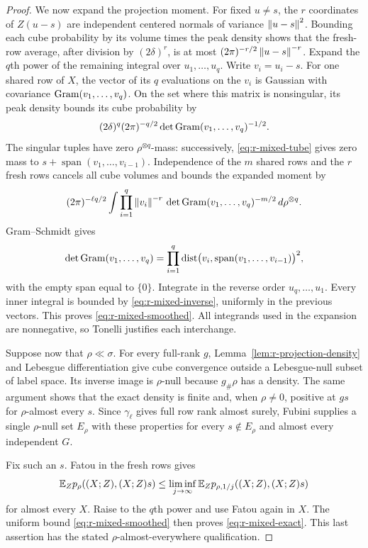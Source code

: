 \begin{proof}
We now expand the projection moment.  For fixed \(u\ne s\), the
\(r\) coordinates of \(Z(u-s)\) are independent centered normals
of variance \(\left\lVert u-s\right\rVert^2\).  Bounding each cube probability by
its volume times the peak density shows that the fresh-row average,
after division by \((2\delta)^r\), is at most
\((2\pi)^{-r/2}\left\lVert u-s\right\rVert^{-r}\).
Expand the \(q\)th power of the remaining integral over
\(u_1,\ldots,u_q\).  Write \(v_i=u_i-s\).  For one shared row of
\(X\), the vector of its \(q\) evaluations on the \(v_i\) is
Gaussian with covariance \(\operatorname{Gram}(v_1,\ldots,v_q)\).  On the set
where this matrix is nonsingular, its peak density bounds its cube
probability by
\[
 (2\delta)^q(2\pi)^{-q/2}
       \det\operatorname{Gram}(v_1,\ldots,v_q)^{-1/2}.
\]
The singular tuples have zero \(\rho^{\otimes q}\)-mass:
successively, \eqref{eq:r-mixed-tube} gives zero mass to
\(s+\operatorname{span}(v_1,\ldots,v_{i-1})\).  Independence of
the \(m\) shared rows and the \(r\) fresh rows cancels all cube
volumes and bounds the expanded moment by
\begin{equation}\label{eq:r-mixed-collision}
 (2\pi)^{-\ell q/2}
 \int\prod_{i=1}^q\left\lVert v_i\right\rVert^{-r}\,
       \det\operatorname{Gram}(v_1,\ldots,v_q)^{-m/2}\,d\rho^{\otimes q}.
\end{equation}
Gram--Schmidt gives
\[
 \det\operatorname{Gram}(v_1,\ldots,v_q)
   =\prod_{i=1}^q
       \operatorname{dist}\bigl(v_i,\operatorname{span}(v_1,\ldots,v_{i-1})\bigr)^2,
\]
with the empty span equal to \(\{0\}\).  Integrate in the reverse
order \(u_q,\ldots,u_1\).  Every inner integral is bounded by
\eqref{eq:r-mixed-inverse}, uniformly in the previous vectors.
This proves \eqref{eq:r-mixed-smoothed}.  All integrands used in
the expansion are nonnegative, so Tonelli justifies each
interchange.

Suppose now that \(\rho\ll\sigma\).  For every full-rank \(g\),
Lemma~\ref{lem:r-projection-density} and Lebesgue differentiation
give cube convergence outside a Lebesgue-null subset of label
space.  Its inverse image is \(\rho\)-null because \(g_\#\rho\)
has a density.  The same argument shows that the exact density is
finite and, when \(\rho\ne0\), positive at \(gs\) for
\(\rho\)-almost every \(s\).  Since \(\gamma_\ell\) gives full
row rank almost surely, Fubini supplies a single
\(\rho\)-null set \(E_\rho\) with these properties for every
\(s\notin E_\rho\) and almost every independent \(G\).

Fix such an \(s\).  Fatou in the fresh rows gives
\[
 \mathbb E_Zp_\rho((X;Z),(X;Z)s)
 \le\liminf_{j\to\infty}
       \mathbb E_Zp_{\rho,1/j}((X;Z),(X;Z)s)
\]
for almost every \(X\).  Raise to the \(q\)th power and use Fatou
again in \(X\).  The uniform bound
\eqref{eq:r-mixed-smoothed} then proves
\eqref{eq:r-mixed-exact}.  This last assertion has the stated
\(\rho\)-almost-everywhere qualification.
\end{proof}

